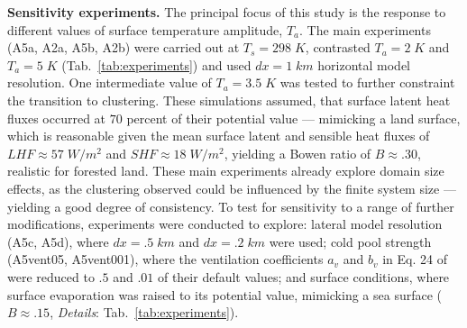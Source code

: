 \documentclass[draft,linenumbers]{agujournal2019}
\begin{document}
\noindent
{\bf Sensitivity experiments.} 
The principal focus of this study is the response to different values of surface temperature amplitude, $T_a$. 
The main experiments (A5a, A2a, A5b, A2b) were carried out at $T_s=298\;K$, contrasted $T_a=2\;K$ and $T_a=5\;K$ (Tab.~\ref{tab:experiments}) and used $dx=1\;km$ horizontal model resolution.
One intermediate value of $T_a=3.5\;K$ was tested to further constraint the transition to clustering.
These simulations assumed, that surface latent heat fluxes occurred at $70$ percent of their potential value --- mimicking a land surface, which is reasonable given the mean surface latent and sensible heat fluxes of $LHF\approx 57\;W/m^2$ and $SHF\approx 18\;W/m^2$, yielding a Bowen ratio of $B\approx .30$, realistic for forested land. 
These main experiments already explore domain size effects, as the clustering observed could be influenced by the finite system size --- yielding a good degree of consistency.
To test for sensitivity to a range of further modifications, experiments were conducted to explore: lateral model resolution (A5c, A5d), where $dx=.5\;km$ and $dx=.2\;km$ were used; cold pool strength (A5vent05, A5vent001), where the ventilation coefficients $a_v$ and $b_v$ in Eq. 24 of \citeauthor{seifert2006two} \citeyear{seifert2006two} were reduced to $.5$ and $.01$ of their default values; and surface conditions, where surface evaporation was raised to its potential value, mimicking a sea surface ($B\approx .15$, {\it Details}: Tab.~\ref{tab:experiments}).
\end{document}
